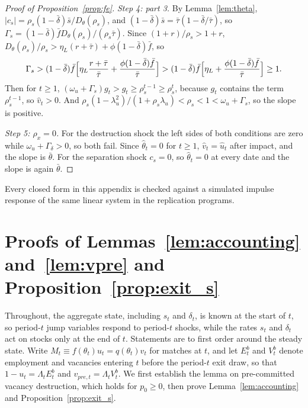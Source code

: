 \documentclass[authoryear, review, 12pt]{elsarticle}
\begin{document}
\begin{proof}[Proof of Proposition~\ref{prop:fe}]
\emph{Step 4: part 3.} By Lemma~\ref{lem:theta}, $|c_s|=\rho_s(1-\bar\delta)\bar{s}/D_\theta(\rho_s)$,
and $(1-\bar\delta)\bar{s}=\bar\tau(1-\bar\delta/\bar\tau)$, so
$\Gamma_s=(1-\bar\delta)\bar{f}D_\theta(\rho_s)/(\rho_s\bar\tau)$. Since $(1+r)/\rho_s>1+r$,
$D_\theta(\rho_s)/\rho_s>\eta_L(r+\bar\tau)+\phi(1-\bar\delta)\bar{f}$, so
\[
	\Gamma_s>(1-\bar\delta)\bar{f}\Bigl[\eta_L\frac{r+\bar\tau}{\bar\tau}+\frac{\phi(1-\bar\delta)\bar{f}}{\bar\tau}\Bigr]
	>(1-\bar\delta)\bar{f}\Bigl[\eta_L+\frac{\phi(1-\bar\delta)\bar{f}}{\bar\tau}\Bigr]\geq1 .
\]
Then for $t\geq1$, $(\omega_u+\Gamma_s)g_t>g_t\geq\rho_s^{t-1}\geq\rho_s^t$, because $g_t$
contains the term $\rho_s^{t-1}$, so $\hat{v}_t>0$. And
$\rho_s(1-\lambda_u^2)/(1+\rho_s\lambda_u)<\rho_s<1<\omega_u+\Gamma_s$, so the slope is positive.

\emph{Step 5: $\rho_x=0$.} For the destruction shock the left sides of both conditions are
zero while $\omega_u+\Gamma_\delta>0$, so both fail. Since $\hat\theta_t=0$ for $t\geq1$,
$\hat{v}_t=\hat{u}_t$ after impact, and the slope is $\bar\theta$. For the separation shock
$c_s=0$, so $\hat\theta_t=0$ at every date and the slope is again $\bar\theta$.
\end{proof}

Every closed form in this appendix is checked against a simulated impulse response of the
same linear system in the replication programs.

\section{Proofs of Lemmas~\ref{lem:accounting} and~\ref{lem:vpre} and Proposition~\ref{prop:exit_s}}
\label{app:proof_ds}

Throughout, the aggregate state, including $s_t$ and $\delta_t$, is known
at the start of $t$, so period-$t$ jump variables respond to period-$t$
shocks, while the rates $s_t$ and $\delta_t$ act on stocks only at the
end of $t$. Statements are to first order around the steady state.
Write $M_t\equiv f(\theta_t)u_t=q(\theta_t)v_t$ for matches at $t$, and
let $E^b_t$ and $V^b_t$ denote employment and vacancies entering
$t$ before the period-$t$ exit draw, so that $1-u_t=\Lambda_tE^b_t$
and $v_{pre,t}=\Lambda_tV^b_t$. We first establish the lemma on
pre-committed vacancy destruction, which holds for $p_0\geq0$, then prove
Lemma~\ref{lem:accounting} and Proposition~\ref{prop:exit_s}.
\end{document}
